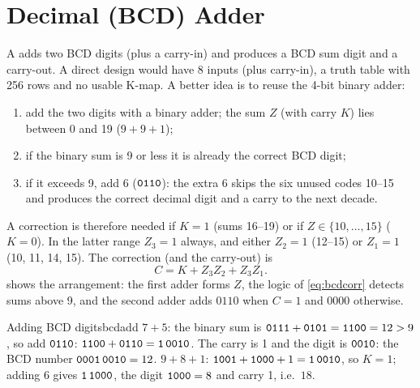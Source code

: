 \section{Decimal (BCD) Adder}\label{sec:bcdadder}
A  adds two BCD digits (plus a carry-in) and produces a BCD sum digit and a carry-out. A direct design would have 8 inputs (plus carry-in), a truth table with 256 rows and no usable K-map. A better idea is to reuse the 4-bit binary adder:
\begin{enumerate}
  \item add the two digits with a binary adder; the sum $Z$ (with carry $K$) lies between 0 and 19 ($9+9+1$);
  \item if the binary sum is 9 or less it is already the correct BCD digit;
  \item if it exceeds 9, add 6 ($\mathtt{0110}$): the extra 6 skips the six unused codes 10--15 and produces the correct decimal digit and a carry to the next decade.
\end{enumerate}
A correction is therefore needed if $K=1$ (sums 16--19) or if $Z\in\{10,\dots,15\}$ ($K=0$). In the latter range $Z_3=1$ always, and either $Z_2=1$ (12--15) or $Z_1=1$ (10, 11, 14, 15). The correction (and the carry-out) is
\begin{equation}
  C = K + Z_3Z_2 + Z_3Z_1 .
  \label{eq:bcdcorr}
\end{equation}
 shows the arrangement: the first adder forms $Z$, the logic of \cref{eq:bcdcorr} detects sums above 9, and the second adder adds $0110$ when $C=1$ and $0000$ otherwise.

\begin{example}{Adding BCD digits}{bcdadd}
$7+5$: the binary sum is $\mathtt{0111}+\mathtt{0101}=\mathtt{1100}=12>9$, so add $\mathtt{0110}$: $\mathtt{1100}+\mathtt{0110}=\mathtt{1\,0010}$. The carry is 1 and the digit is $\mathtt{0010}$: the BCD number $\mathtt{0001\,0010}=12$. \quad
$9+8+1$: $\mathtt{1001}+\mathtt{1000}+1=\mathtt{1\,0010}$, so $K=1$; adding 6 gives $\mathtt{1\,1000}$, the digit $\mathtt{1000}=8$ and carry 1, i.e.\ $18$.
\end{example}




